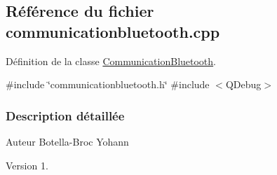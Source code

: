 \hypertarget{ecran-_t_t_p_a_2communicationbluetooth_8cpp}{}\subsection{Référence du fichier communicationbluetooth.\+cpp}
\label{ecran-_t_t_p_a_2communicationbluetooth_8cpp}


Définition de la classe \hyperlink{class_communication_bluetooth}{Communication\+Bluetooth}.  


{\ttfamily \#include \char`\"{}communicationbluetooth.\+h\char`\"{}}\newline
{\ttfamily \#include $<$Q\+Debug$>$}\newline


\subsubsection{Description détaillée}
\begin{DoxyAuthor}{Auteur}
Botella-\/\+Broc Yohann
\end{DoxyAuthor}
\begin{DoxyVersion}{Version}
1. 
\end{DoxyVersion}
